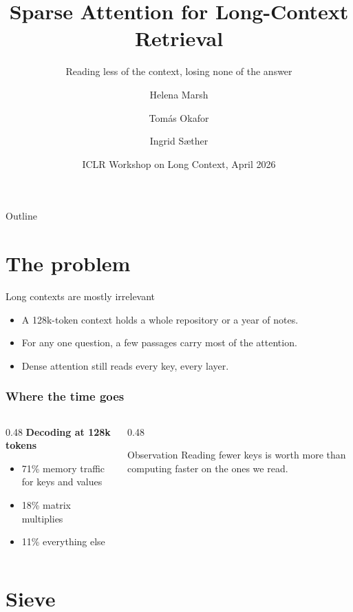 \documentclass[aspectratio=169]{beamer}
\title{Sparse Attention for Long-Context Retrieval}
\subtitle{Reading less of the context, losing none of the answer}
\author{Helena Marsh \and Tomás Okafor \and Ingrid Sæther}
\institute{Northfield University \quad Lighthouse Research Lab}
\date{ICLR Workshop on Long Context, April 2026}
\begin{document}
\begin{frame}
  \titlepage
\end{frame}

\begin{frame}{Outline}
  \tableofcontents
\end{frame}

\section{The problem}

\begin{frame}{Long contexts are mostly irrelevant}
  \begin{itemize}
    \item A 128k-token context holds a whole repository or a year of notes.
    \pause
    \item For any one question, a few passages carry most of the attention.
    \pause
    \item Dense attention still reads \alert{every} key, every layer.
  \end{itemize}
\end{frame}

\begin{frame}
  \frametitle{Where the time goes}
  \begin{columns}[T]
    \begin{column}{0.48\textwidth}
      \textbf{Decoding at 128k tokens}
      \begin{itemize}
        \item 71\% memory traffic for keys and values
        \item 18\% matrix multiplies
        \item 11\% everything else
      \end{itemize}
    \end{column}
    \begin{column}{0.48\textwidth}
      \begin{block}{Observation}
        Reading fewer keys is worth more than computing faster on the ones we read.
      \end{block}
    \end{column}
  \end{columns}
\end{frame}

\section{Sieve}
\end{document}
